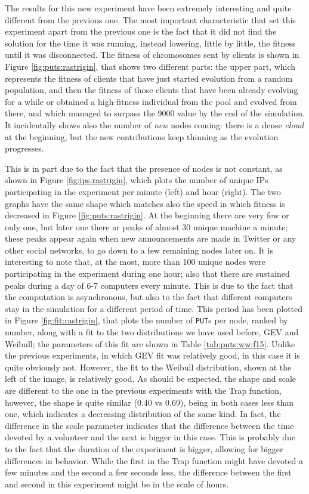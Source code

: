\documentclass[journal,onecolumn]{IEEEtran}
\begin{document}
The results for this new experiment have been extremely interesting
and quite different from the previous one. The most important
characteristic that set this experiment apart from the previous one is
the fact that it did not find the solution for the time it was
running, instead lowering, little by little, the fitness until it was
disconnected. The fitness of chromosomes sent by clients is shown in
Figure \ref{fig:puts:rastrigin}, that shows two different parts: the
upper part, which represents the fitness of clients that have just
started evolution from a random population, and then the fitness of
those clients that have been already evolving for a while or obtained
a high-fitness individual from the pool and evolved from there, and
which managed to surpass the 9000 value by the end of the
simulation. It incidentally shows also the number of {\em new} nodes
coming: there is a dense {\em cloud} at the beginning, but the new
contributions keep thinning as the evolution progresses. 

This is in part due to the fact that the presence of nodes is not
constant, as shown in Figure \ref{fig:ips:rastrigin}, which plots the
number of unique IPs participating in the experiment per minute (left)
and hour (right). The two graphs have the same shape which matches
also the speed in which fitness is decreased in Figure
\ref{fig:puts:rastrigin}. At the beginning there are very few or only
one, but later one there ar peaks of almost 30 unique machine a
minute; these peaks appear again when new announcements are made in
Twitter or any other social networks, to go down to a few remaining
nodes later on. It is interesting to note that, at the most, more than
100 unique nodes were participating in the experiment during one hour;
also that there are sustained peaks during a day of 6-7 computers
every minute. This is due to the fact that the computation is
asynchronous, but also to the fact that different computers stay in
the simulation for a different period of time. This period has been
plotted in Figure \ref{fig:fit:rastrigin}, that plots the number of
{\tt PUT}s per node, ranked by number, along with a fit to the two
distributions we have used before, GEV and Weibull; the parameters of
this fit are shown in Table \ref{tab:puts:ww:f15}. Unlike the previous
experiments, in which GEV fit was relatively good, in this case it is
quite obviously not. However, the fit to the Weibull distribution,
shown at the left of the image, is relatively good. As should be
expected, the shape and scale are different to the one in the previous
experiments with the Trap function, however, the shape is quite
similar (0.40 vs 0.69), being in both cases less than one, which
indicates a decreasing distribution of the same kind. In fact, the
difference in the scale parameter indicates that the difference
between the time devoted by a volunteer and the next is bigger in this
case. This is probably due to the fact that the duration of the
experiment is bigger, allowing for bigger differences in
behavior. While the first in the Trap function might have devoted a
few minutes and the second a few seconds less, the difference between
the first and second in this experiment might be in the scale of
hours. 
\end{document}
